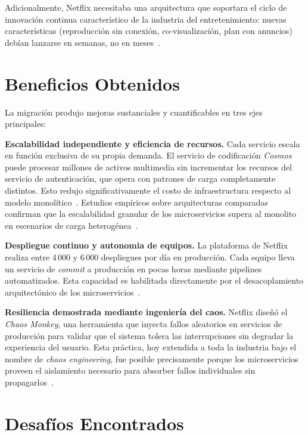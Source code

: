 \documentclass[11pt,a4paper]{article}
\begin{document}
\noindent
Adicionalmente, Netflix necesitaba una arquitectura que soportara el ciclo de innovaci\'on
continua caracter\'istico de la industria del entretenimiento: nuevas caracter\'isticas
(reproducci\'on sin conexi\'on, co-visualizaci\'on, plan con anuncios) deb\'ian lanzarse en
semanas, no en meses~\cite{miguel2022}.

\section{Beneficios Obtenidos}

La migraci\'on produjo mejoras sustanciales y cuantificables en tres ejes principales:

\medskip
\noindent\textbf{Escalabilidad independiente y eficiencia de recursos.}
Cada servicio escala en funci\'on exclusiva de su propia demanda. El servicio de
codificaci\'on \textit{Cosmos} puede procesar millones de activos multimedia sin incrementar
los recursos del servicio de autenticaci\'on, que opera con patrones de carga completamente
distintos. Esto redujo significativamente el costo de infraestructura respecto al modelo
monol\'itico~\cite{miguel2022}. Estudios emp\'iricos sobre arquitecturas comparadas confirman
que la escalabilidad granular de los microservicios supera al monolito en escenarios de
carga heterog\'enea~\cite{blinowski2022}.

\medskip
\noindent\textbf{Despliegue continuo y autonomia de equipos.}
La plataforma de Netflix realiza entre 4\,000 y 6\,000 despliegues por d\'ia en producci\'on.
Cada equipo lleva un servicio de \textit{commit} a producci\'on en pocas horas mediante
pipelines automatizados. Esta capacidad es habilitada directamente por el desacoplamiento
arquitect\'onico de los microservicios~\cite{balalaie2016}.

\medskip
\noindent\textbf{Resiliencia demostrada mediante ingenier\'ia del caos.}
Netflix dise\~n\'o el \textit{Chaos Monkey}, una herramienta que inyecta fallos aleatorios en
servicios de producci\'on para validar que el sistema tolera las interrupciones sin
degradar la experiencia del usuario. Esta pr\'actica, hoy extendida a toda la industria
bajo el nombre de \textit{chaos engineering}, fue posible precisamente porque los
microservicios proveen el aislamiento necesario para absorber fallos individuales sin
propagarlos~\cite{dragoni2017}.

\section{Desaf\'ios Encontrados}
\end{document}
